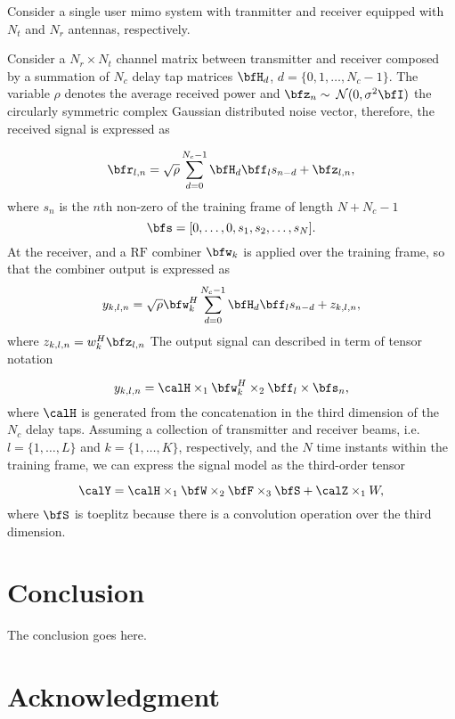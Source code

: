 \documentclass[conference]{IEEEtran}
\begin{document}
Consider a single user \gls{mimo} system with tranmitter and receiver equipped with
$N_t$  and  $N_r$ antennas, respectively.


Consider a $N_r \times N_t$ channel matrix between transmitter and receiver
composed by a summation of  $N_c$ delay tap matrices $\bfH_d$,
$d=\{0,1, \ldots, N_c-1\}$. The variable $\rho$ denotes the average received power and $\bfz_n \sim $
$\mathcal{N}(0,\sigma ^2\bfI)$ the circularly symmetric complex Gaussian
distributed noise vector, therefore, the received signal is expressed as

\begin{equation}
  \label{eq:rx_signal}
   \bfr_{l,n} = \sqrt{\rho} \sum_{d=0}^{N_c-1} \bfH_d\bff_{l}s_{n-d} + \bfz_{l,n},
\end{equation}
where $s_{n}$ is the $n$th non-zero of the training frame of length $N + N_c-1$
\begin{equation}
  \label{eq:frame}
  \bfs = [0, \ldots, 0,  s_1, s_2, \ldots, s_N ].
\end{equation}
At the receiver, and a $\textrm{RF}$  combiner $\bfw_k$ is applied over the
training frame, so that the combiner output is expressed as
\begin{equation}
  \label{eq:output_combiner}
   y_{k,l,n} = \sqrt{\rho}\bfw^H_k \sum_{d=0}^{N_c-1} \bfH_d\bff_{l}s_{n-d} + z_{k,l,n},
 \end{equation}
 where $z_{k,l,n} = w^H_k\bfz_{l,n}$
The output signal can described in term of tensor notation

\begin{equation}
  \label{eq:output_combiner_tensor}
  y_{k,l,n} =  \calH \times_1 \bfw^H_k \times_2 \bff_{l} \times \bfs_n,
\end{equation}
where $\calH$ is generated from the concatenation in the third dimension of the $N_c$ delay taps.
Assuming a collection  of transmitter and receiver beams, i.e.
$l=\{1,\ldots , L \}$ and $k=\{1,\ldots , K \}$, respectively, and the $N$ time
instants within the training frame, we can express the signal model as the
third-order tensor

\begin{equation}
  \label{eq:tensor_model}
  \calY =  \calH \times_1 \bfW \times_2 \bfF \times_3 \bfS + \calZ \times_1 W,
\end{equation}
where $\bfS$ is toeplitz because there is a convolution operation over the third dimension.


\section{Conclusion}
The conclusion goes here.

\section*{Acknowledgment}



\end{document}
